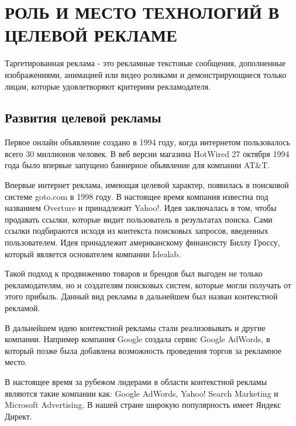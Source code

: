 \chapter{РОЛЬ И МЕСТО ТЕХНОЛОГИЙ В ЦЕЛЕВОЙ РЕКЛАМЕ}

Таргетированная реклама - это рекламные текстовые сообщения, дополненные изображениями, анимацией или видео роликами и демонстрирующиеся только  лицам, которые удовлетворяют критериям рекламодателя.

\section{Развития целевой рекламы}

Первое онлайн объявление создано в 1994 году, когда интернетом пользовалось всего 30 миллионов человек. В веб версии магазина HotWired 27 октября 1994 года было впервые запущено баннерное обьявление для компании  AT\&T.\cite{kumar2016evolution}

Впервые интернет реклама, имеющая целевой характер, появилась в поисковой системе goto.com в 1998 году. В настоящее время компания известна под названием Overture и принадлежит Yahoo!. Идея заключалась в том, чтобы продавать ссылки, которые видит пользователь в результатах поиска. Сами ссылки подбираются исходя из контекста поисковых запросов, введенных пользователем. Идея принадлежит американскому финансисту Биллу Гроссу, который является основателем компании Idealab.\cite{wang2016display}  

Такой подход к продвижению товаров и брендов был выгоден не только рекламодателям, но и создателям поисковых систем, которые могли получать от этого прибыль. Данный вид рекламы в дальнейшем был назван контекстной рекламой.

В дальнейшем идею контекстной рекламы стали реализовывать и другие компании. Например компания Google создала сервис Google AdWords, в который позже была добавлена возможность проведения торгов за рекламное место.

В настоящее время за рубежом лидерами в области контекстной рекламы являются такие компании как: Google AdWords, Yahoo! Search Marketing и Microsoft Advertising. В нашей стране широкую популярность имеет Яндекс Директ.

